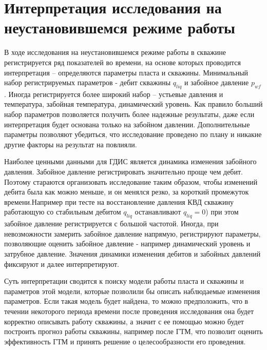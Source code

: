 
\section{Интерпретация исследования на неустановившемся режиме работы}

В ходе исследования на неустановившемся режиме работы в скважине регистрируется ряд показателей во времени, на основе которых проводится интерпретация -- определяются параметры пласта и скважины. Минимальный набор регистрируемых параметров - дебит скважины $q_{liq}$ и  забойное давление $p_{wf}$. Иногда регистрируется более широкий набор -- устьевые давления и температура, забойная температура, динамический уровень. Как правило больший набор параметров позволяется получить более надежные результаты, даже если интерпретация будет основана только на забойном давлении. Дополнительные параметры позволяют убедиться, что исследование проведено по плану и никакие другие факторы на результат на повлияли.

Наиболее ценными данными для ГДИС является динамика изменения забойного давления. Забойное давление регистрировать значительно проще чем дебит. Поэтому стараются организовать исследование таким образом, чтобы изменений  дебита была как можно меньше, и он менялся резко, за короткий промежуток времени.Например при тесте на восстановление давления КВД скважину работающую со стабильным дебитом $q_{liq}$ останавливают $q_{liq} = 0$) при этом забойное давление регистрируется с большой частотой. Иногда, при невозможности замерить забойное давление напрямую, регистрируют параметры, позволяющие оценить забойное давление - например динамический уровень и затрубное давление. Значения динамики изменения дебитов и забойных давлений фиксируют и далее интерпретируют.

Суть интерпретации сводится к поиску модели работы пласта и скважины и параметров этой модели, которые позволили бы описать наблюдаемые изменения параметров. Если такая модель будет найдена, то можно предположить, что в течении некоторого периода времени после проведения исследования она будет корректно описывать работу скважины, а значит с ее помощью можно будет построить прогноз работы скважины, например после ГТМ, что позволит оценить эффективность ГТМ и принять решение о целесообразности его проведения.


